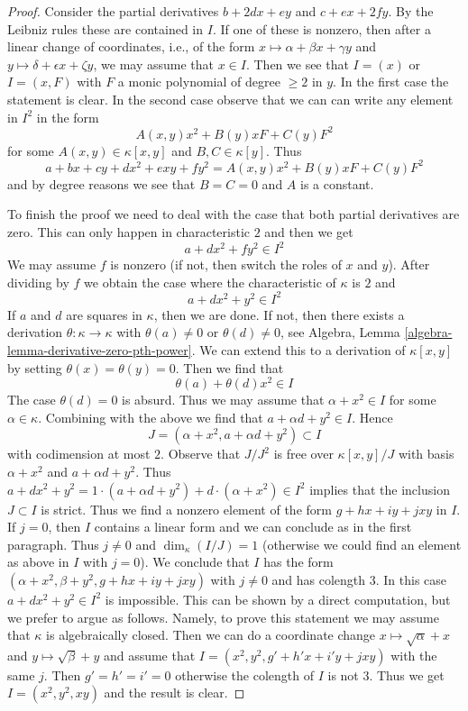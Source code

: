 \begin{proof}
Consider the partial derivatives $b + 2dx + ey$ and
$c + ex + 2fy$. By the Leibniz rules these are contained in $I$.
If one of these is nonzero, then after a linear change of coordinates,
i.e., of the form $x \mapsto \alpha + \beta x + \gamma y$ and
$y \mapsto \delta + \epsilon x + \zeta y$, we may assume
that $x \in I$. Then we see that $I = (x)$ or $I = (x, F)$ with
$F$ a monic polynomial of degree $\geq 2$ in $y$.
In the first case the statement is clear. In the second case
observe that we can can write any element in $I^2$ in the form
$$
A(x, y) x^2 + B(y) x F + C(y) F^2
$$
for some $A(x, y) \in \kappa[x, y]$ and $B, C \in \kappa[y]$.
Thus
$$
a + b x + c y + d x^2 + exy + f y^2 = A(x, y) x^2 + B(y) x F + C(y) F^2
$$
and by degree reasons we see that $B = C = 0$ and $A$ is a constant.

\medskip\noindent
To finish the proof we need to deal with the case that both
partial derivatives are zero. This can only happen in characteristic $2$
and then we get
$$
a + d x^2 + f y^2 \in I^2
$$
We may assume $f$ is nonzero (if not, then switch the roles of $x$ and $y$).
After dividing by $f$ we obtain the case where the characteristic of
$\kappa$ is $2$ and
$$
a + d x^2 + y^2 \in I^2
$$
If $a$ and $d$ are squares in $\kappa$, then we are done. If not,
then there exists a derivation $\theta : \kappa \to \kappa$ with
$\theta(a) \not = 0$ or $\theta(d) \not = 0$, see
Algebra, Lemma \ref{algebra-lemma-derivative-zero-pth-power}.
We can extend this to a derivation of $\kappa[x, y]$ by setting
$\theta(x) = \theta(y) = 0$. Then we find that
$$
\theta(a) + \theta(d) x^2 \in I
$$
The case $\theta(d) = 0$ is absurd. Thus we may assume
that $\alpha + x^2 \in I$ for some $\alpha \in \kappa$.
Combining with the above we find that $a + \alpha d + y^2 \in I$.
Hence
$$
J = (\alpha + x^2, a + \alpha d + y^2) \subset I
$$
with codimension at most $2$. Observe that
$J/J^2$ is free over $\kappa[x, y]/J$ with basis
$\alpha + x^2$ and $a + \alpha d + y^2$.
Thus $a + d x^2 + y^2 =
1 \cdot (a + \alpha d + y^2) + d \cdot (\alpha + x^2) \in I^2$
implies that the inclusion $J \subset I$ is strict.
Thus we find a nonzero element of the form $g + hx + iy + jxy$ in $I$.
If $j = 0$, then $I$ contains a linear form and we can
conclude as in the first paragraph. Thus $j \not = 0$
and $\dim_\kappa(I/J) = 1$ (otherwise we could find
an element as above in $I$ with $j = 0$).
We conclude that $I$ has the form
$(\alpha + x^2, \beta + y^2, g + hx + iy + jxy)$
with $j \not = 0$ and has colength $3$.
In this case $a + dx^2 + y^2 \in I^2$ is impossible.
This can be shown by a direct computation, but we prefer to argue
as follows. Namely, to prove this statement we may assume that
$\kappa$ is algebraically closed. Then we can do a coordinate
change $x \mapsto \sqrt{\alpha} + x$ and $y \mapsto \sqrt{\beta} + y$
and assume that $I = (x^2, y^2, g' + h'x + i'y + jxy)$ with the same $j$.
Then $g' = h' = i' = 0$ otherwise the colength of $I$ is not $3$.
Thus we get $I = (x^2, y^2, xy)$ and the result is clear.
\end{proof}

